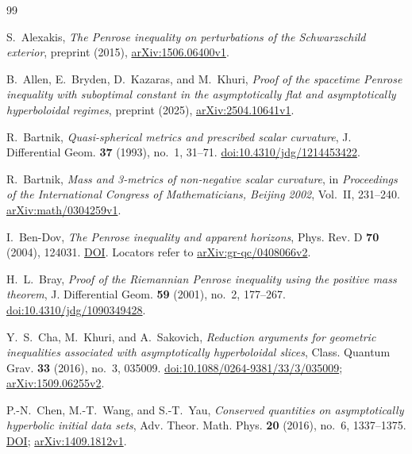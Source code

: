 \begin{thebibliography}{99}

S.~Alexakis,
\emph{The Penrose inequality on perturbations of the Schwarzschild exterior},
preprint (2015),
\href{https://arxiv.org/abs/1506.06400v1}{arXiv:1506.06400v1}.

B.~Allen, E.~Bryden, D.~Kazaras, and M.~Khuri,
\emph{Proof of the spacetime Penrose inequality with suboptimal constant in the asymptotically flat and asymptotically hyperboloidal regimes},
preprint (2025),
\href{https://arxiv.org/abs/2504.10641v1}{arXiv:2504.10641v1}.

R.~Bartnik,
\emph{Quasi-spherical metrics and prescribed scalar curvature},
J. Differential Geom. \textbf{37} (1993), no.~1, 31--71.
\href{https://doi.org/10.4310/jdg/1214453422}{doi:10.4310/jdg/1214453422}.

R.~Bartnik,
\emph{Mass and 3-metrics of non-negative scalar curvature},
in \emph{Proceedings of the International Congress of Mathematicians,
Beijing 2002}, Vol.~II, 231--240.
\href{https://arxiv.org/abs/math/0304259v1}{arXiv:math/0304259v1}.

I.~Ben-Dov,
\emph{The Penrose inequality and apparent horizons},
Phys. Rev. D \textbf{70} (2004), 124031.
\href{https://doi.org/10.1103/PhysRevD.70.124031}{DOI}.
Locators refer to
\href{https://arxiv.org/abs/gr-qc/0408066v2}{arXiv:gr-qc/0408066v2}.

H.~L.~Bray,
\emph{Proof of the Riemannian Penrose inequality using the positive mass theorem},
J. Differential Geom. \textbf{59} (2001), no.~2, 177--267.
\href{https://doi.org/10.4310/jdg/1090349428}{doi:10.4310/jdg/1090349428}.

Y.~S.~Cha, M.~Khuri, and A.~Sakovich,
\emph{Reduction arguments for geometric inequalities associated with asymptotically hyperboloidal slices},
Class. Quantum Grav. \textbf{33} (2016), no.~3, 035009.
\href{https://doi.org/10.1088/0264-9381/33/3/035009}{doi:10.1088/0264-9381/33/3/035009};
\href{https://arxiv.org/abs/1509.06255v2}{arXiv:1509.06255v2}.

P.-N.~Chen, M.-T.~Wang, and S.-T.~Yau,
\emph{Conserved quantities on asymptotically hyperbolic initial data sets},
Adv. Theor. Math. Phys. \textbf{20} (2016), no.~6, 1337--1375.
\href{https://doi.org/10.4310/ATMP.2016.v20.n6.a2}{DOI};
\href{https://arxiv.org/abs/1409.1812v1}{arXiv:1409.1812v1}.


\end{thebibliography}
